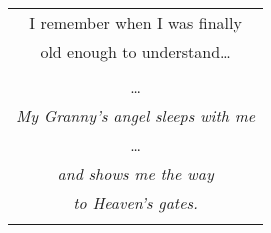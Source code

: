\documentclass{article}
\begin{document}
\begin{center}
\begin{tabular}{c}
\\
I remember when I was finally \\
old enough to understand\ldots{} \\
\\
\ldots{} \\
\textit{My Granny's angel sleeps with me} \\
\ldots{} \\
\textit{and shows me the way} \\
\textit{to Heaven's gates.} \\
\\
\end{tabular}
\end{center}
\newpage
\end{document}
